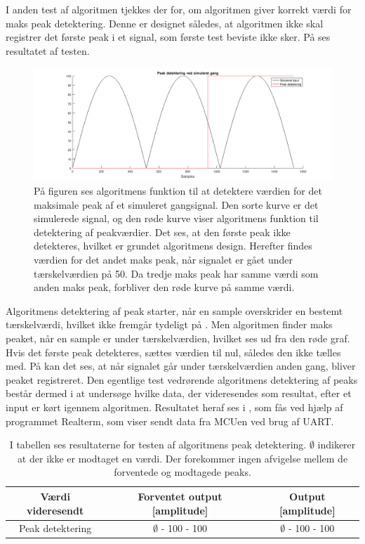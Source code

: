 I anden test af algoritmen tjekkes der for, om algoritmen giver korrekt værdi for maks peak detektering. Denne er designet således, at algoritmen ikke skal registrer det første peak i et signal, som første test beviste ikke sker. På  ses resultatet af testen.
\begin{figure}[H]
	\centering
	\includegraphics[width=.9\textwidth]{figures/cDesign/test_peak_gang.png}
	\caption{På figuren ses algoritmens funktion til at detektere værdien for det maksimale peak af et simuleret gangsignal. Den sorte kurve er det simulerede signal, og den røde kurve viser algoritmens funktion til detektering af peakværdier. Det ses, at den første peak ikke detekteres, hvilket er grundet algoritmens design. Herefter findes værdien for det andet maks peak, når signalet er gået under tærskelværdien på 50. Da tredje maks peak har samme værdi som anden maks peak, forbliver den røde kurve på samme værdi.}
	\label{fig:test_peak_gang}
\end{figure}\vspace{-.5cm}
Algoritmens detektering af peak starter, når en sample overskrider en bestemt tærskelværdi, hvilket ikke fremgår tydeligt på . Men algoritmen finder maks peaket, når en sample er under tærskelværdien, hvilket ses ud fra den røde graf. Hvis det første peak detekteres, sættes værdien til nul, således den ikke tælles med. På  kan det ses, at når signalet går under tærskelværdien anden gang, bliver peaket registreret. Den egentlige test vedrørende algoritmens detektering af peaks består dermed i at undersøge hvilke data, der videresendes som resultat, efter et input er kørt igennem algoritmen. Resultatet heraf ses i , som fås ved hjælp af programmet Realterm, som viser sendt data fra MCUen ved brug af UART.
\begin{table}[H]
	\centering
	\begin{tabular}{ccc}
		\hline
		\rowcolor[HTML]{C0C0C0} 
		Værdi videresendt & Forventet output [amplitude] & Output [amplitude] \\ \hline
		Peak detektering & $\emptyset$ - 100 - 100 & $\emptyset$ - 100 - 100 \\ \hline
	\end{tabular}
	\caption{I tabellen ses resultaterne for testen af algoritmens peak detektering. $\emptyset$ indikerer at der ikke er modtaget en værdi. Der forekommer ingen afvigelse mellem de forventede og modtagede peaks.}
	\label{tab:test_res_peak}
\end{table}\vspace{-0.5cm}
